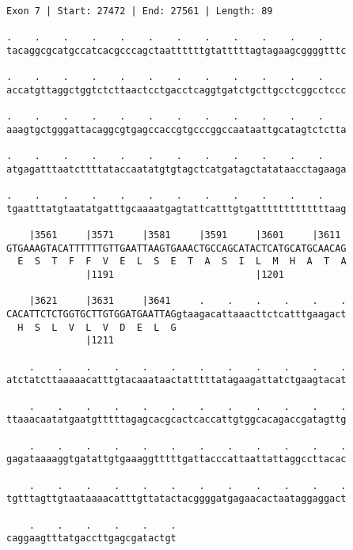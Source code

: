 \documentclass{article}
\begin{document}
\newpage
\begin{Verbatim}[fontfamily=courier]
Exon 7 | Start: 27472 | End: 27561 | Length: 89

.    .    .    .    .    .    .    .    .    .    .    .    
tacaggcgcatgccatcacgcccagctaattttttgtatttttagtagaagcggggtttc

.    .    .    .    .    .    .    .    .    .    .    .    
accatgttaggctggtctcttaactcctgacctcaggtgatctgcttgcctcggcctccc

.    .    .    .    .    .    .    .    .    .    .    .    
aaagtgctgggattacaggcgtgagccaccgtgcccggccaataattgcatagtctctta

.    .    .    .    .    .    .    .    .    .    .    .    
atgagatttaatcttttataccaatatgtgtagctcatgatagctatataacctagaaga

.    .    .    .    .    .    .    .    .    .    .    .    
tgaatttatgtaatatgatttgcaaaatgagtattcatttgtgatttttttttttttaag

    |3561     |3571     |3581     |3591     |3601     |3611 
GTGAAAGTACATTTTTTGTTGAATTAAGTGAAACTGCCAGCATACTCATGCATGCAACAG
  E  S  T  F  F  V  E  L  S  E  T  A  S  I  L  M  H  A  T  A
              |1191                         |1201           

    |3621     |3631     |3641     .    .    .    .    .    .
CACATTCTCTGGTGCTTGTGGATGAATTAGgtaagacattaaacttctcatttgaagact
  H  S  L  V  L  V  D  E  L  G                              
              |1211                                         

    .    .    .    .    .    .    .    .    .    .    .    .
atctatcttaaaaacatttgtacaaataactatttttatagaagattatctgaagtacat

    .    .    .    .    .    .    .    .    .    .    .    .
ttaaacaatatgaatgtttttagagcacgcactcaccattgtggcacagaccgatagttg

    .    .    .    .    .    .    .    .    .    .    .    .
gagataaaaggtgatattgtgaaaggtttttgattacccattaattattaggccttacac

    .    .    .    .    .    .    .    .    .    .    .    .
tgtttagttgtaataaaacatttgttatactacggggatgagaacactaataggaggact

    .    .    .    .    .    .
caggaagtttatgaccttgagcgatactgt
\end{Verbatim}
\newpage
\end{document}
